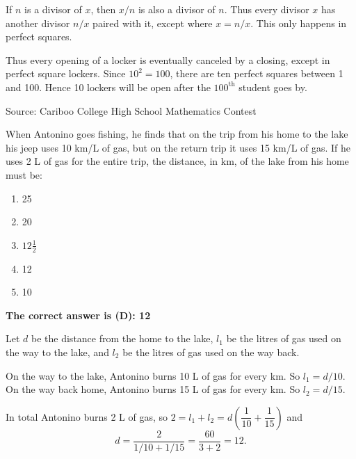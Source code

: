 \documentclass{article}
\begin{document}
If $n$ is a divisor of $x$, then $x/n$ is also a divisor of $n$. Thus every divisor $x$ has another divisor $n/x$ paired with it, except where $x = n/x$. This only happens in perfect squares.

Thus every opening of a locker is eventually canceled by a closing, except in perfect square lockers. Since $10^2=100$, there are ten perfect squares between 1 and 100. Hence 10 lockers will be open after the $100^\text{th}$ student goes by.

\vskip 1.5cm


\scriptsize
Source: Cariboo College High School Mathematics Contest

\normalsize
When Antonino goes fishing, he finds that on the trip from his home to the lake his jeep uses 10 km/L of gas, but on the return trip it uses 15 km/L of gas. If he uses 2 L of gas for the entire trip, the distance, in km, of the lake from his home must be:
\begin{enumerate}[noitemsep,topsep=0mm,leftmargin=*,widest=D,label=\Alph*)]
	\item 25
	\item 20
	\item $12\frac{1}{2}$
	\item 12
	\item 10
\end{enumerate}

\textbf{The correct answer is (D): 12}

Let $d$ be the distance from the home to the lake, $l_1$ be the litres of gas used on the way to the lake, and $l_2$ be the litres of gas used on the way back.

On the way to the lake, Antonino burns 10 L of gas for every km. So $l_1 = d/10$.
On the way back home, Antonino burns 15 L of gas for every km. So $l_2 = d/15$.

In total Antonino burns 2 L of gas, so $2 = l_1 + l_2 = d \left(\dfrac{1}{10}+\dfrac{1}{15}\right)$ and
\[
d = \frac{2}{1/10 + 1/15} = \frac{60}{3+2} = 12.
\]
  
\vskip 1.5cm

\end{document}

